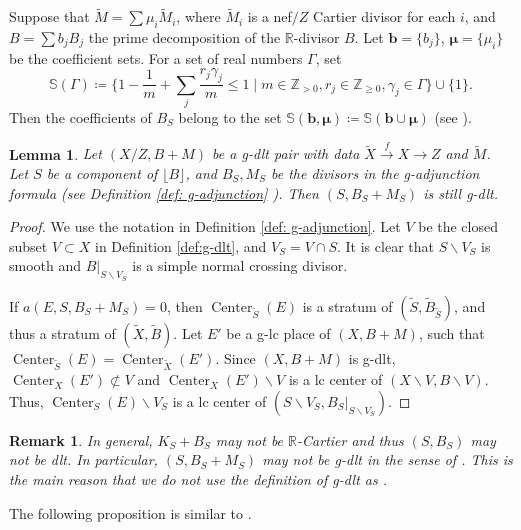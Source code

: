 \documentclass[11pt]{amsart}
\newcommand{\Zz}{\mathbb{Z}}
\newcommand{\Rr}{\mathbb{R}}
\newcommand{\Center}{\operatorname{Center}}
\newtheorem{lemma}[theorem]{Lemma}
\newtheorem{remark}[theorem]{Remark}
\begin{document}
	Suppose that $\tilde M=\sum \mu_i \tilde M_i$, where $\tilde M_i$ is a nef$/Z$ Cartier divisor for each $i$, and $B=\sum b_j B_j$ the prime decomposition of the $\Rr$-divisor $B$. Let $\bm{b}=\{b_j\}$, $\bm{\mu}=\{\mu_i\}$ be the coefficient sets. For a set of real numbers $\Gamma$, set 
\begin{equation}\label{eq: S}
\mathbb{S}(\Gamma) \coloneqq \{1-\frac{1}{m}+\sum_{j} \frac{r_j\gamma_j}{m}\le 1 \mid m\in\mathbb{Z}_{>0},r_j\in\Zz_{\ge0}, \gamma_j \in \Gamma\}\cup\{1\}.
\end{equation}
Then the coefficients of $B_{S}$ belong to the set $\mathbb{S}(\bm{b},\bm{\mu}) \coloneqq \mathbb S(\bm{b} \cup \bm{\mu})$ (see \cite[Proposition 4.9]{BZ16}).

\begin{lemma}\label{lem:adjgdlt}
	Let $(X/Z,B+M)$ be a g-dlt pair with data $\tilde X \xrightarrow{f} X \to Z$ and $\tilde M$. Let $S$ be a component of $\lfloor B \rfloor$, and $B_S,M_S$ be the divisors in the g-adjunction formula (see Definition \ref{def: g-adjunction}
). Then $(S,B_S+M_S)$ is still g-dlt. 
\end{lemma}

\begin{proof}
	We use the notation in Definition \ref{def: g-adjunction}. Let $V$ be the closed subset $V\subset X$ in Definition \ref{def:g-dlt}, and $V_S=V\cap S$. It is clear that $S\backslash V_S$ is smooth and $B|_{S\backslash V_S}$ is a simple normal crossing divisor. 
	
	If $a(E,S,B_S+M_S)=0$, then $\Center_{\tilde S}(E)$ is a stratum of $(\tilde{S},\tilde{B}_{\tilde S})$, and thus a stratum of $({\tilde X}, \tilde B)$. Let $E'$ be a g-lc place of $(X,B+M)$, such that $\Center_{\tilde S}(E)=\Center_{\tilde X}(E')$. Since $(X,B+M)$ is g-dlt, $\Center_{X}(E') \not\subset V$ and $\Center_{X}(E')\backslash V$ is a lc center of $(X\backslash V,B\backslash V)$. Thus, $\Center_{S}(E)\backslash V_S$ is a lc center of $(S\backslash V_S,B_S|_{S\backslash V_S})$.
\end{proof}

\begin{remark}
	In general, $K_S+B_S$ may not be $\Rr$-Cartier and thus $(S,B_S)$ may not be dlt. In particular, $(S, B_S+M_S)$ may not be g-dlt in the sense of \cite{Bir16a}. This is the main reason that we do not use the definition of g-dlt as \cite{Bir16a}.
\end{remark}

The following proposition is similar to \cite[Proposition 3.9.2]{Fujino07}.
\end{document}
